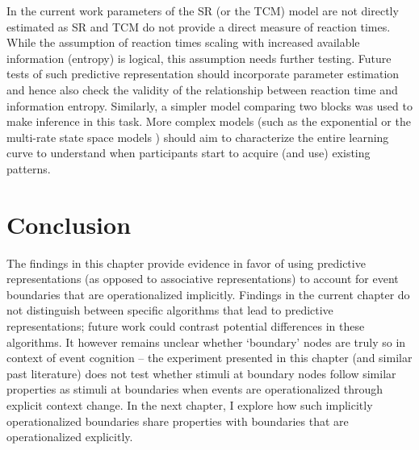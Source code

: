 In the current work parameters of the SR (or the TCM) model are not directly estimated as SR and TCM do not provide a direct measure of reaction times. While the assumption of reaction times scaling with increased available information (entropy) is logical, this assumption needs further testing. Future tests of such predictive representation should incorporate parameter estimation and hence also check the validity of the relationship between reaction time and information entropy. Similarly, a simpler model comparing two blocks was used to make inference in this task. More complex models (such as the exponential or the multi-rate state space models \parencite{savalia2024leap, smith2006interacting, mcdougle2015explicit}) should aim to characterize the entire learning curve to understand when participants start to acquire (and use) existing patterns. 


\section{Conclusion}
The findings in this chapter provide evidence in favor of using predictive representations (as opposed to associative representations) to account for event boundaries that are operationalized implicitly. Findings in the current chapter do not distinguish between specific algorithms that lead to predictive representations; future work could contrast potential differences in these algorithms. It however remains unclear whether `boundary' nodes are truly so in context of event cognition -- the experiment presented in this chapter (and similar past literature) does not test whether stimuli at boundary nodes follow similar properties as stimuli at boundaries when events are operationalized through explicit context change. In the next chapter, I explore how such implicitly operationalized boundaries share properties with boundaries that are operationalized explicitly. 